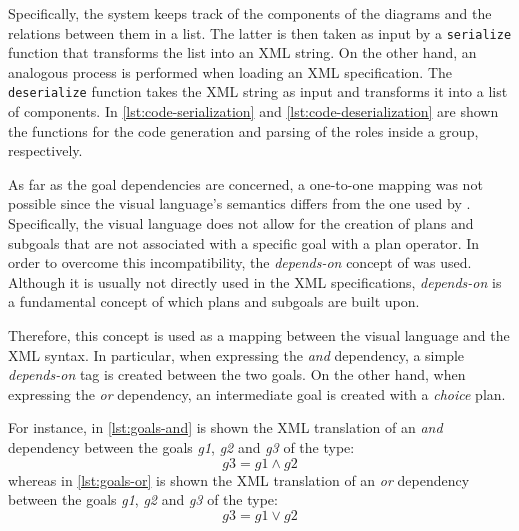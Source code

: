 Specifically, the system keeps track of the components of the diagrams and the relations between them in a list.
The latter is then taken as input by a \texttt{serialize} function that transforms the list into an XML string.
On the other hand, an analogous process is performed when loading an XML specification.
The \texttt{deserialize} function takes the XML string as input and transforms it into a list of components.
In \cref{lst:code-serialization} and \cref{lst:code-deserialization} are shown the functions for the code generation and parsing of the roles inside a group, respectively.

\begin{figure}[H]
    
\end{figure}

\begin{figure}[H]
    
\end{figure}

As far as the goal dependencies are concerned, a one-to-one mapping was not possible since the visual language's semantics differs from the one used by \moise{}.
Specifically, the visual language does not allow for the creation of plans and subgoals that are not associated with a specific goal with a plan operator.
In order to overcome this incompatibility, the \textit{depends-on} concept of \moise{} was used.
Although it is usually not directly used in the XML specifications, \textit{depends-on} is a fundamental concept of \moise{} which plans and subgoals are built upon.

Therefore, this concept is used as a mapping between the visual language and the XML syntax.
In particular, when expressing the \textit{and} dependency, a simple \textit{depends-on} tag is created between the two goals.
On the other hand, when expressing the \textit{or} dependency, an intermediate goal is created with a \textit{choice} plan.

For instance, in \cref{lst:goals-and} is shown the XML translation of an \textit{and} dependency between the goals \textit{g1}, \textit{g2} and \textit{g3} of the type:
$$g3 = g1 \wedge g2$$
whereas in \cref{lst:goals-or} is shown the XML translation of an \textit{or} dependency between the goals \textit{g1}, \textit{g2} and \textit{g3} of the type:
$$g3 = g1 \vee g2$$

